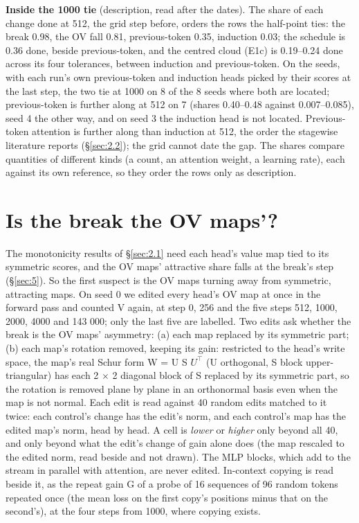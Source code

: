 \documentclass[11pt]{article}
\begin{document}
\textbf{Inside the 1000 tie} (description, read after the dates). The share of each change done at 512, the grid step before, orders the rows the half-point ties: the break 0.98, the OV fall 0.81, previous-token 0.35, induction 0.03; the schedule is 0.36 done, beside previous-token, and the centred cloud (E1c) is 0.19--0.24 done across its four tolerances, between induction and previous-token. On the seeds, with each run's own previous-token and induction heads picked by their scores at the last step, the two tie at 1000 on 8 of the 8 seeds where both are located; previous-token is further along at 512 on 7 (shares 0.40--0.48 against 0.007--0.085), seed 4 the other way, and on seed 3 the induction head is not located. Previous-token attention is further along than induction at 512, the order the stagewise literature reports (\S\ref{sec:2.2}); the grid cannot date the gap. The shares compare quantities of different kinds (a count, an attention weight, a learning rate), each against its own reference, so they order the rows only as description.

\section{Is the break the OV maps'?}\label{sec:6}

The monotonicity results of \S\ref{sec:2.1} need each head's value map tied to its symmetric scores, and the OV maps' attractive share falls at the break's step (\S\ref{sec:5}). So the first suspect is the OV maps turning away from symmetric, attracting maps. On seed 0 we edited every head's OV map at once in the forward pass and counted V again, at step 0, 256 and the five steps 512, 1000, 2000, 4000 and 143 000; only the last five are labelled. Two edits ask whether the break is the OV maps' asymmetry: (a) each map replaced by its symmetric part; (b) each map's rotation removed, keeping its gain: restricted to the head's write space, the map's real Schur form W = U S $U^{\top}$ (U orthogonal, S block upper-triangular) has each 2 $\times $ 2 diagonal block of S replaced by its symmetric part, so the rotation is removed plane by plane in an orthonormal basis even when the map is not normal. Each edit is read against 40 random edits matched to it twice: each control's change has the edit's norm, and each control's map has the edited map's norm, head by head. A cell is \emph{lower} or \emph{higher} only beyond all 40, and only beyond what the edit's change of gain alone does (the map rescaled to the edited norm, read beside and not drawn). The MLP blocks, which add to the stream in parallel with attention, are never edited. In-context copying is read beside it, as the repeat gain G of a probe of 16 sequences of 96 random tokens repeated once (the mean loss on the first copy's positions minus that on the second's), at the four steps from 1000, where copying exists.
\end{document}
